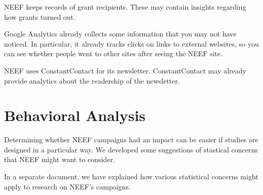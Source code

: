 \documentclass{article}
\begin{document}
NEEF keeps records of grant recipients. These may contain insights regarding
how grants turned out.

Google Analytics already collects some information that you may not have noticed.
In particular, it already tracks clicks on links to external websites, so you
can see whether people went to other sites after seeing the NEEF site.

NEEF uses ConstantContact for its newsletter. ConstantContact may already
provide analytics about the readership of the newsletter.

\section{Behavioral Analysis}
Determining whether NEEF campaigns had an impact
can be easier if studies are designed in a particular way.
We developed some suggestions of stastical concerns that
NEEF might want to consider.

In a separate document, we have explained how various
statistical concerns might apply to research on NEEF's campaigns.
\end{document}
